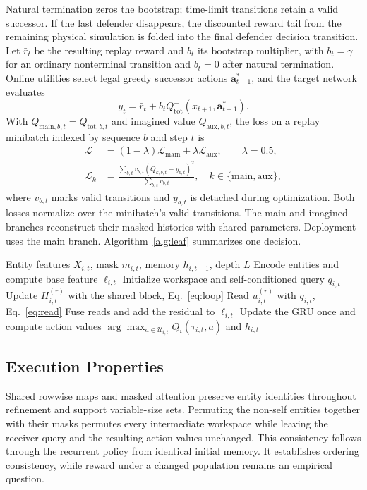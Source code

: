 Natural termination zeros the bootstrap; time-limit transitions retain a valid successor. If the last defender disappears, the discounted reward tail from the remaining physical simulation is folded into the final defender decision transition. Let $\bar r_t$ be the resulting replay reward and $b_t$ its bootstrap multiplier, with $b_t=\gamma$ for an ordinary nonterminal transition and $b_t=0$ after natural termination. Online utilities select legal greedy successor actions $\boldsymbol a^*_{t+1}$, and the target network evaluates
\begin{equation}
 y_t=\bar r_t+b_t
 Q^-_{\mathrm{tot}}(x_{t+1},\boldsymbol a^*_{t+1}).
 \label{eq:td-target}
\end{equation}
With $Q_{\mathrm{main},b,t}=Q_{\mathrm{tot},b,t}$ and imagined value $Q_{\mathrm{aux},b,t}$, the loss on a replay minibatch indexed by sequence $b$ and step $t$ is
\begin{align}
 \mathcal L&=(1-\lambda)\mathcal L_{\mathrm{main}}
                  +\lambda\mathcal L_{\mathrm{aux}},\qquad\lambda=0.5,\nonumber\\
 \mathcal L_k&=\frac{\sum_{b,t} v_{b,t}(Q_{k,b,t}-y_{b,t})^2}
 {\sum_{b,t}v_{b,t}},
 \quad k\in\{\mathrm{main},\mathrm{aux}\},
 \label{eq:td-loss}
\end{align}
where $v_{b,t}$ marks valid transitions and $y_{b,t}$ is detached during optimization. Both losses normalize over the minibatch's valid transitions. The main and imagined branches reconstruct their masked histories with shared parameters. Deployment uses the main branch. Algorithm~\ref{alg:leaf} summarizes one decision.

\begin{algorithm}[!t]
\caption{LEAF at one defender decision}
\label{alg:leaf}
\begin{algorithmic}[1]
\Require Entity features $X_{i,t}$, mask $m_{i,t}$, memory $h_{i,t-1}$, depth $L$
\State Encode entities and compute base feature $\ell_{i,t}$
\State Initialize workspace and self-conditioned query $q_{i,t}$
\State Update $H_{i,t}^{(r)}$ with the shared block, Eq.~\eqref{eq:loop}
\State Read $u_{i,t}^{(r)}$ with $q_{i,t}$, Eq.~\eqref{eq:read}
\EndFor
\State Fuse reads and add the residual to $\ell_{i,t}$
\State Update the GRU once and compute action values
\State \Return $\arg\max_{a\in\mathcal U_{i,t}}Q_i(\tau_{i,t},a)$ and $h_{i,t}$
\end{algorithmic}
\end{algorithm}

\subsection{Execution Properties}
Shared rowwise maps and masked attention preserve entity identities throughout refinement and support variable-size sets. Permuting the non-self entities together with their masks permutes every intermediate workspace while leaving the receiver query and the resulting action values unchanged. This consistency follows through the recurrent policy from identical initial memory. It establishes ordering consistency, while reward under a changed population remains an empirical question.

